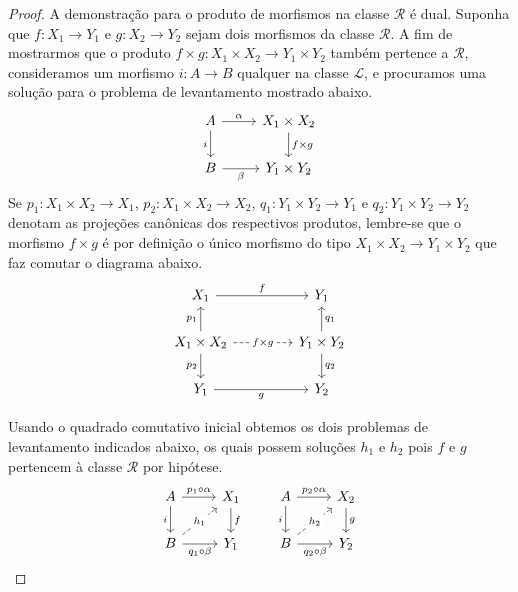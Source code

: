 \begin{proof}
  A demonstração para o produto de morfismos na classe $\mathcal{R}$ é dual.
  Suponha que $f: X_{1} \to Y_{1}$ e $g: X_{2} \to Y_{2}$ sejam dois morfismos da classe $\mathcal{R}$.
  A fim de mostrarmos que o produto $f \times g: X_{1} \times X_{2} \to Y_{1} \times Y_{2}$ também pertence a $\mathcal{R}$, consideramos um morfismo $i: A \to B$ qualquer na classe $\mathcal{L}$, e procuramos uma solução para o problema de levantamento mostrado abaixo.
  \begin{displaymath}
    \begin{tikzcd}
      A
      \arrow[r, "\alpha"]
      \arrow[d, "i" swap]
      & X_{1} \times X_{2}
      \arrow[d, "f \times g"]
      \\ B
      \arrow[r, "\beta" swap]
      & Y_{1} \times Y_{2}
    \end{tikzcd}
  \end{displaymath}
  Se $p_{1}: X_{1} \times X_{2} \to X_{1}$, $p_{2}: X_{1} \times X_{2} \to X_{2}$, $q_{1}: Y_{1} \times Y_{2} \to Y_{1}$ e $q_{2}: Y_{1} \times Y_{2} \to Y_{2}$ denotam as projeções canônicas dos respectivos produtos, lembre-se que o morfismo $f \times g$ é por definição o único morfismo do tipo $X_{1} \times X_{2} \to Y_{1} \times Y_{2}$ que faz comutar o diagrama abaixo.
  \begin{displaymath}
    \begin{tikzcd}[column sep=1.5cm]
      X_{1}
      \arrow[r, "f"]
      & Y_{1}
      \\ X_{1} \times X_{2}
      \arrow[u, "p_{1}"]
      \arrow[r, dashed, "f \times g" description]
      \arrow[d, "p_{2}" swap]
      & Y_{1} \times Y_{2}
      \arrow[u, "q_{1}" swap]
      \arrow[d, "q_{2}"]
      \\ Y_{1}
      \arrow[r, "g" swap]
      & Y_{2}
    \end{tikzcd}
  \end{displaymath}

  Usando o quadrado comutativo inicial obtemos os dois problemas de levantamento indicados abaixo, os quais possem soluções $h_{1}$ e $h_{2}$ pois $f$ e $g$ pertencem à classe $\mathcal{R}$ por hipótese.
  \begin{displaymath}
    \begin{tikzcd}
      A
      \arrow[r, "p_{1} \circ \alpha"]
      \arrow[d, "i" swap]
      & X_{1}
      \arrow[d, "f"]
      \\ B
      \arrow[r, "q_{1} \circ \beta" swap]
      \arrow[ru, dashed, "h_{1}" description]
      & Y_{1}
    \end{tikzcd}
    \qquad
    \begin{tikzcd}
      A
      \arrow[r, "p_{2} \circ \alpha"]
      \arrow[d, "i" swap]
      & X_{2}
      \arrow[d, "g"]
      \\ B
      \arrow[r, "q_{2} \circ \beta" swap]
      \arrow[ru, dashed, "h_{2}" description]
      & Y_{2}
    \end{tikzcd}
  \end{displaymath}


\end{proof}
